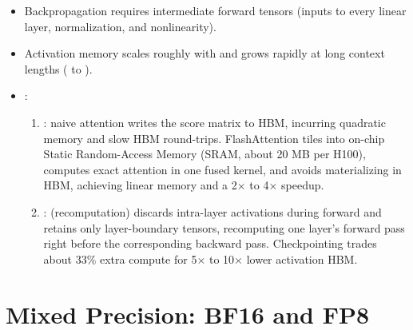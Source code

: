 \begin{itemize}
    \item Backpropagation requires intermediate forward tensors (inputs to every linear layer, normalization, and nonlinearity).
    \item Activation memory scales roughly with  and grows rapidly at long context lengths ( to ).
    \item {}:
    \begin{enumerate}
        \item {}: naive attention writes the \shape{[B, H, T, T]} score matrix to HBM, incurring quadratic memory and slow HBM round-trips. FlashAttention tiles  into on-chip Static Random-Access Memory (SRAM, about 20 MB per H100), computes exact attention in one fused kernel, and avoids materializing \shape{[T, T]} in HBM, achieving linear memory and a 2$\times$ to 4$\times$ speedup.
        \item {}:  (recomputation) discards intra-layer activations during forward and retains only layer-boundary tensors, recomputing one layer's forward pass right before the corresponding backward pass. Checkpointing trades about 33\% extra compute for 5$\times$ to 10$\times$ lower activation HBM.
    \end{enumerate}
\end{itemize}

\section{Mixed Precision: BF16 and FP8}

